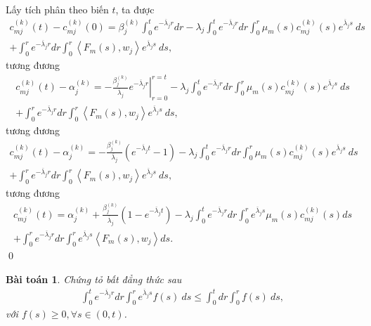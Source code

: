 \documentclass[12pt,a4paper]{article}
\newtheorem{theorem}{Bài toán}[section]
\theoremstyle{definition}
\begin{document}
Lấy tích phân theo biến $t$, ta được
\begin{align*}
    c_{mj}^{(k)}(t) - c_{mj}^{(k)}(0)
    = \beta_j^{(k)} \int_0^t e^{-\overline{\lambda}_j r} dr
    - \lambda_j \int_0^t e^{-\overline{\lambda}_j r} dr \int_0^r \mu_m(s) c_{mj}^{(k)}(s) e^{\overline{\lambda}_j s}\:ds  \\
    + \int_0^r e^{-\overline{\lambda}_j r} dr \int_0^r \left<F_m(s),w_j\right>e^{\overline{\lambda}_j s}\:ds,
\end{align*}
tương đương
\begin{align*}
    c_{mj}^{(k)}(t) - \alpha_j^{(k)}
    = - \frac{\beta_j^{(k)}}{\overline{\lambda}_j} \left.e^{-\overline{\lambda}_j r}\right|_{r=0}^{r=t}
    - \lambda_j \int_0^t e^{-\overline{\lambda}_j r} dr \int_0^r \mu_m(s) c_{mj}^{(k)}(s) e^{\overline{\lambda}_j s}\:ds  \\
    + \int_0^r e^{-\overline{\lambda}_j r} dr \int_0^r \left<F_m(s),w_j\right>e^{\overline{\lambda}_j s}\:ds,
\end{align*}
tương đương
\begin{align*}
    c_{mj}^{(k)}(t) - \alpha_j^{(k)}
    = - \frac{\beta_j^{(k)}}{\overline{\lambda}_j} \left(e^{-\overline{\lambda}_j t} - 1\right)
    - \lambda_j \int_0^t e^{-\overline{\lambda}_j r} dr \int_0^r \mu_m(s) c_{mj}^{(k)}(s) e^{\overline{\lambda}_j s}\:ds  \\
    + \int_0^r e^{-\overline{\lambda}_j r} dr \int_0^r \left<F_m(s),w_j\right>e^{\overline{\lambda}_j s}\:ds,
\end{align*}
tương đương
\begin{align*}
    c_{mj}^{(k)}(t) =
    \alpha_j^{(k)} + \frac{\beta_j^{(k)}}{\overline{\lambda}_j} \left(1 - e^{-\overline{\lambda}_j t}\right)
    - \lambda_j \int_0^t e^{-\overline{\lambda}_j r} dr \int_0^r e^{\overline{\lambda}_j s} \mu_m(s) c_{mj}^{(k)}(s)ds  \\
    + \int_0^r e^{-\overline{\lambda}_j r} dr \int_0^r e^{\overline{\lambda}_j s} \left<F_m(s),w_j\right>ds.
\end{align*} \qed

\begin{theorem}
    Chứng tỏ bất đẳng thức sau
    \begin{align*}
        \int_0^t e^{-\overline{\lambda}_j r} dr \int_0^r e^{\overline{\lambda}_j s} f(s)\:ds
        \le \int_0^t dr \int_0^r f(s)\:ds,
    \end{align*}
    với $f(s) \ge 0, \forall s \in (0,t)$.
\end{theorem}
\end{document}
